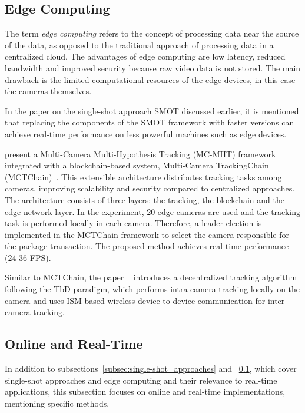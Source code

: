 \subsection{Edge Computing}\label{subsec:edge_computing}
The term \textit{edge computing} refers to the concept of processing data near the source of the data, as opposed to the traditional approach of processing data in a centralized cloud. The advantages of edge computing are low latency, reduced bandwidth and improved security because raw video data is not stored. The main drawback is the limited computational resources of the edge devices, in this case the cameras themselves.

In the paper on the single-shot approach SMOT discussed earlier, it is mentioned that replacing the components of the SMOT framework with faster versions can achieve real-time performance on less powerful machines such as edge devices.

\citeauthor{Wang23b} present a Multi-Camera Multi-Hypothesis Tracking (MC-MHT) framework integrated with a blockchain-based system, Multi-Camera TrackingChain (MCTChain)~\cite{Wang23b}. This extensible architecture distributes tracking tasks among cameras, improving scalability and security compared to centralized approaches. The architecture consists of three layers: the tracking, the blockchain and the edge network layer. In the experiment, 20 edge cameras are used and the tracking task is performed locally in each camera. Therefore, a leader election is implemented in the MCTChain framework to select the camera responsible for the package transaction. The proposed method achieves real-time performance (24-36 FPS).

Similar to MCTChain, the paper ~\cite{Nikodem20} introduces a decentralized tracking algorithm following the TbD paradigm, which performs intra-camera tracking locally on the camera and uses ISM-based wireless device-to-device communication for inter-camera tracking.

\subsection{Online and Real-Time}\label{subsec:online_and_real-time}
In addition to subsections~\ref{subsec:single-shot_approaches} and ~\ref{subsec:edge_computing}, which cover single-shot approaches and edge computing and their relevance to real-time applications, this subsection focuses on online and real-time implementations, mentioning specific methods.

